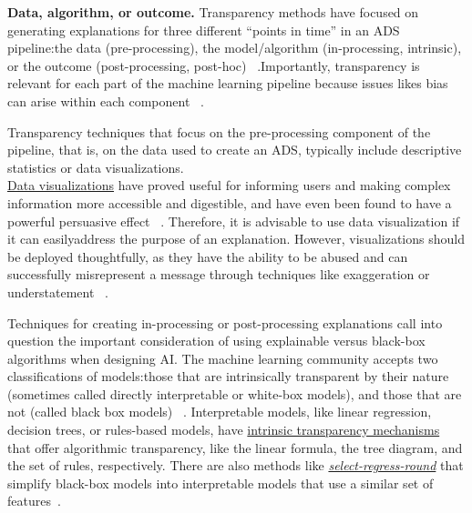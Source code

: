 \textbf{Data, algorithm, or outcome.} Transparency methods have focused on generating explanations for three different ``points in time'' in an ADS pipeline:the data (pre-processing), the model/algorithm (in-processing, intrinsic), or the outcome (post-processing, post-hoc) ~\cite{DBLP:journals/jmlr/AryaBCDHHHLLMMP20, ventocilla2018towards}.Importantly, transparency is relevant for each part of the machine learning pipeline because issues likes bias can arise within each component ~\cite{yang2020fairness}.

Transparency techniques that focus on the pre-processing component of the pipeline, that is, on the data used to create an ADS, typically include descriptive statistics or data visualizations.\\
\underline{Data visualizations} have proved useful for informing users and making complex information more accessible and digestible, and have even been found to have a powerful persuasive effect ~\cite{DBLP:journals/tvcg/PandeyMNSB14, tal2016blinded}. Therefore, it is advisable to use data visualization if it can easilyaddress the purpose of an explanation. However, visualizations should be deployed thoughtfully, as they have the ability to be abused and can successfully misrepresent a message through techniques like exaggeration or understatement ~\cite{pandey2015deceptive}.

Techniques for creating in-processing or post-processing explanations call into question the important consideration of using explainable versus black-box algorithms when designing AI. The machine learning community accepts two classifications of models:those that are intrinsically transparent by their nature (sometimes called directly interpretable or white-box models), and those that are not (called black box models) ~\cite{DBLP:journals/corr/abs-2012-01805}. Interpretable models, like linear regression, decision trees, or rules-based models, have \underline{intrinsic transparency mechanisms} that offer algorithmic transparency, like the linear formula, the tree diagram, and the set of rules, respectively. There are also methods like \underline{\emph{select-regress-round}} that simplify black-box models into interpretable models that use a similar set of features~\cite{jung2017simple}.



